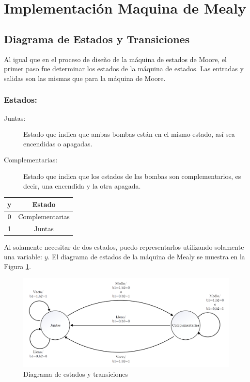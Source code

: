 \section*{Implementación Maquina de Mealy}
\subsection*{Diagrama de Estados y Transiciones}
Al igual que en el proceso de diseño de la máquina de estados de Moore, el primer paso fue determinar los estados de la máquina de estados. Las entradas y salidas son las mismas que para la máquina de Moore.

\subsubsection*{Estados:}

\begin{description}
\item[Juntas:] Estado que indica que ambas bombas están en el mismo estado, así sea encendidas o apagadas.
\item[Complementarias:] Estado que indica que los estados de las bombas son complementarios, es decir, una encendida y la otra apagada.
\end{description}

\begin{table}[H]
	\centering
	\begin{tabular}{c|c}
	y & Estado \\ 
	\hline 
	0 & Complementarias \\
	1 & Juntas \\ 
	\end{tabular} 
\end{table}

Al solamente necesitar de dos estados, puedo representarlos utilizando solamente una variable: $y$. El diagrama de estados de la máquina de Mealy se muestra en la Figura \ref{1_fig_estados_mealy}.


\begin{figure}[H]
\centering
\includegraphics[scale=0.4]{images/diagrama_estados_mealy.png}
\caption{Diagrama de estados y transiciones} \label{1_fig_estados_mealy}
\end{figure}

